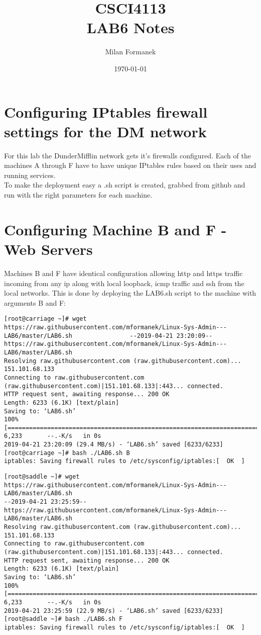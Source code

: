 \documentclass[11pt,onside]{article}
\title{\blue CSCI4113 \\
\blueb LAB6 Notes}
\author{Milan Formanek}
\date{\today} %
\begin{document}
\maketitle
\section{Configuring IPtables firewall settings for the DM network}
For this lab the DunderMifflin network gets it's firewalls configured. Each of the machines A through F have to have unique IPtables rules based on their uses and running services. \\
To make the deployment easy a .sh script is created, grabbed from github and run with the right parameters for each machine.

\section{Configuring Machine B and F - Web Servers}
Machines B and F have identical configuration allowing http and https traffic incoming from any ip along with local loopback, icmp traffic and ssh from the local networks. This is done by deploying the LAB6.sh script to the machine with arguments B and F:
\begin{lstlisting}
[root@carriage ~]# wget https://raw.githubusercontent.com/mformanek/Linux-Sys-Admin---LAB6/master/LAB6.sh                --2019-04-21 23:20:09--  https://raw.githubusercontent.com/mformanek/Linux-Sys-Admin---LAB6/master/LAB6.sh
Resolving raw.githubusercontent.com (raw.githubusercontent.com)... 151.101.68.133
Connecting to raw.githubusercontent.com (raw.githubusercontent.com)|151.101.68.133|:443... connected.
HTTP request sent, awaiting response... 200 OK
Length: 6233 (6.1K) [text/plain]
Saving to: ‘LAB6.sh’
100%[===============================================================================>] 6,233       --.-K/s   in 0s
2019-04-21 23:20:09 (29.4 MB/s) - ‘LAB6.sh’ saved [6233/6233]
[root@carriage ~]# bash ./LAB6.sh B
iptables: Saving firewall rules to /etc/sysconfig/iptables:[  OK  ]
\end{lstlisting}
\begin{lstlisting}
[root@saddle ~]# wget https://raw.githubusercontent.com/mformanek/Linux-Sys-Admin---LAB6/master/LAB6.sh
--2019-04-21 23:25:59--  https://raw.githubusercontent.com/mformanek/Linux-Sys-Admin---LAB6/master/LAB6.sh
Resolving raw.githubusercontent.com (raw.githubusercontent.com)... 151.101.68.133
Connecting to raw.githubusercontent.com (raw.githubusercontent.com)|151.101.68.133|:443... connected.
HTTP request sent, awaiting response... 200 OK
Length: 6233 (6.1K) [text/plain]
Saving to: ‘LAB6.sh’
100%[============================================================================>] 6,233       --.-K/s   in 0s
2019-04-21 23:25:59 (22.9 MB/s) - ‘LAB6.sh’ saved [6233/6233]
[root@saddle ~]# bash ./LAB6.sh F
iptables: Saving firewall rules to /etc/sysconfig/iptables:[  OK  ]
\end{lstlisting}
\clearpage{}
\end{document}
